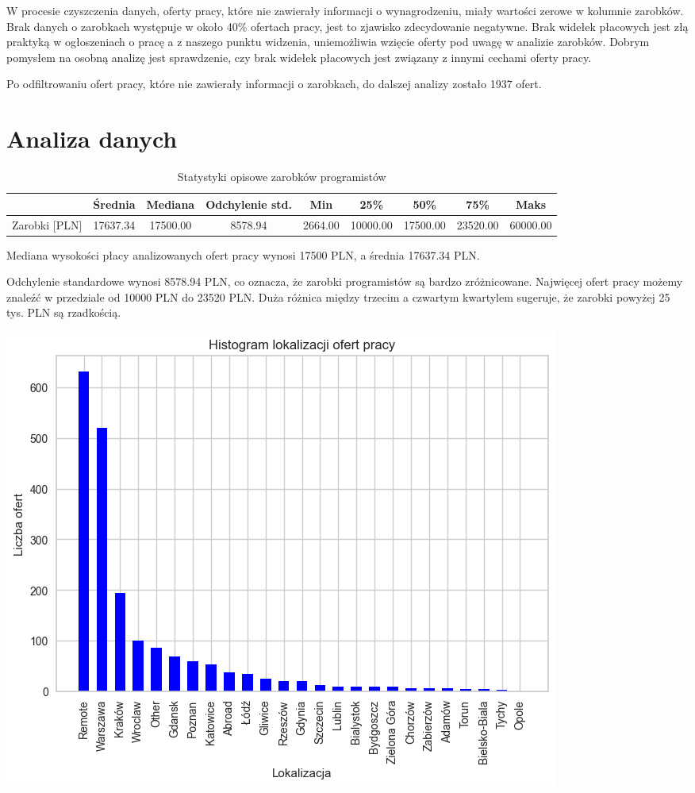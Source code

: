\documentclass{article}
\begin{document}
W procesie czyszczenia danych, oferty pracy, które nie zawierały informacji o wynagrodzeniu, miały wartości zerowe w kolumnie zarobków.
Brak danych o zarobkach występuje w około 40\% ofertach pracy, jest to zjawisko zdecydowanie negatywne.
Brak widełek płacowych jest złą praktyką w ogłoszeniach o pracę a z naszego punktu widzenia, uniemożliwia wzięcie oferty pod uwagę w analizie zarobków.
Dobrym pomysłem na osobną analizę jest sprawdzenie, czy brak widełek płacowych jest związany z innymi cechami oferty pracy.
\medskip

Po odfiltrowaniu ofert pracy, które nie zawierały informacji o zarobkach, do dalszej analizy zostało 1937 ofert.

\pagebreak

\section{Analiza danych}

\begin{table}[h!]
    \centering
    \begin{tabular}{|c|c|c|c|c|c|c|c|c|}
        \hline
        & Średnia & Mediana & Odchylenie std. & Min & 25\% & 50\% & 75\% & Maks \\
        \hline
        Zarobki [PLN] & 17637.34 & 17500.00 & 8578.94 & 2664.00 & 10000.00 & 17500.00 & 23520.00 & 60000.00 \\
        \hline
    \end{tabular}
    \caption{Statystyki opisowe zarobków programistów}
    \label{tab:zarobki}
\end{table}

Mediana wysokości płacy analizowanych ofert pracy wynosi 17500 PLN, a średnia 17637.34 PLN.

Odchylenie standardowe wynosi 8578.94 PLN, co oznacza, że zarobki programistów są bardzo zróżnicowane.
Najwięcej ofert pracy możemy znaleźć w przedziale od 10000 PLN do 23520 PLN.
Duża różnica między trzecim a czwartym kwartylem sugeruje, że zarobki powyżej 25 tys. PLN są rzadkością.

\begin{center}
    \includegraphics[scale=0.6]{img/location_hist.png}
\end{center}
\end{document}
